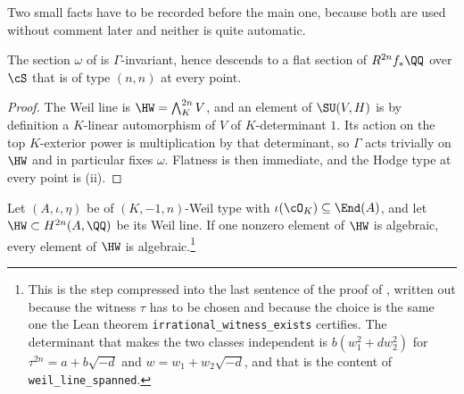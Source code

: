 Two small facts have to be recorded before the main one, because both are used
without comment later and neither is quite automatic.

\begin{lemma}\label{lem:omegadescends}
The section $\omega$ of  is $\Gamma$-invariant, hence
descends to a flat section of $R^{2n}f_{*}\QQ$ over $\cS$ that is of type
$(n,n)$ at every point.
\end{lemma}

\begin{proof}
The Weil line is $\HW=\bigwedge^{2n}_{K}V$, and an element of $\SU(V,H)$ is by
definition a $K$-linear automorphism of $V$ of $K$-determinant $1$. Its action
on the top $K$-exterior power is multiplication by that determinant, so
$\Gamma$ acts trivially on $\HW$ and in particular fixes $\omega$. Flatness is
then immediate, and the Hodge type at every point is
(ii).
\end{proof}

\begin{lemma}\label{lem:onecomponent}
Let $(A,\iota,\eta)$ be of $(K,-1,n)$-Weil type with
$\iota(\cO_{K})\subseteq\End(A)$, and let $\HW\subset H^{2n}(A,\QQ)$ be its
Weil line. If one nonzero element of $\HW$ is algebraic, every element of
$\HW$ is algebraic.\footnote{This is the step compressed into the last
sentence of the proof of , written out because the
witness $\tau$ has to be chosen and because the choice is the same one the
Lean theorem \texttt{irrational\_witness\_exists} certifies. The determinant
that makes the two classes independent is $b(w_{1}^{2}+dw_{2}^{2})$ for
$\tau^{2n}=a+b\sqrt{-d}$ and $w=w_{1}+w_{2}\sqrt{-d}$, and that is the content
of \texttt{weil\_line\_spanned}.}
\end{lemma}

